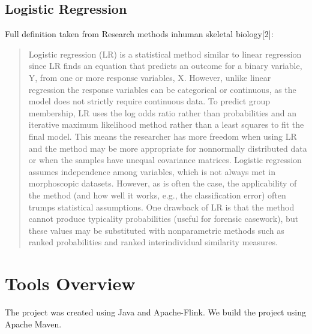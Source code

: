 \subsection{Logistic Regression}
Full definition taken from Research methods inhuman skeletal biology[2]: 
\begin{quote} 
Logistic regression (LR) is a statistical method similar to linear regression since LR finds an equation that predicts an outcome for a binary variable, Y, from one or more response variables, X. However, unlike linear regression the response variables can be categorical or continuous, as the model does not strictly require continuous data. To predict group membership, LR uses the log odds ratio rather than probabilities and an iterative maximum likelihood method rather than a least squares to fit the final model. This means the researcher has more freedom when using LR and the method may be more appropriate for nonnormally distributed data or when the samples have unequal covariance matrices. Logistic regression assumes independence among variables, which is not always met in morphoscopic datasets. However, as is often the case, the applicability of the method (and how well it works, e.g., the classification error) often trumps statistical assumptions. One drawback of LR is that the method cannot produce typicality probabilities (useful for forensic casework), but these values may be substituted with nonparametric methods such as ranked probabilities and ranked interindividual similarity measures. 
\end{quote}

\section{Tools Overview}
The project was created using Java and Apache-Flink. We build the project using Apache Maven. 

